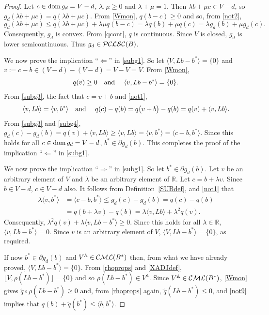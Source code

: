 \documentclass[letterpaper]{article}
\theoremstyle{plain}
\theoremstyle{definition}
\numberwithin{equation}{section}
\newcommand{\A}{{\mathbb A}}
\newcommand{\bra}[2]{\langle#1,#2\rangle}
\newcommand{\CML}{{\cal CML}}
\newcommand{\dom}{\hbox{\rm dom}}
\newcommand{\lr}{\Longrightarrow}
\newcommand{\PCLSC}{{\cal PCLSC}}
\newcommand{\qt}{\wt q}
\newcommand{\RR}{\mathbb R}
\newcommand{\rl}{\Longleftarrow}
\newcommand{\wt}{\widetilde}
\newcommand{\xbra}[2]{\lfloor#1,#2\rfloor}
\newcommand{\Def}{Definition~\ref}
\begin{document}
\begin{proof}
Let $c \in \dom\,g_d = V - d$, $\lambda, \mu \ge 0$ and $\lambda + \mu = 1$. Then $\lambda b + \mu c \in V - d$, so $g_d(\lambda b + \mu c) = q(\lambda b + \mu c)$.   From \eqref{Wmon}, $q(b - c) \ge 0$  and so, from \eqref{not2},
%
$$g_d(\lambda b + \mu c) \le q(\lambda b + \mu c) + \lambda\mu q(b - c) = \lambda q(b) + \mu q(c) = \lambda g_d(b) + \mu g_d(c).$$
%
Consequently, $g_d$ is convex.  From \eqref{qcont}, $q$ is continuous.   Since $V$ is closed, $g_d$ is lower semicontinuous.   Thus $g_d \in \PCLSC(B)$.
\par
We now prove the implication ``$\rl$'' in \eqref{subg1}.  So let $\bra{V}{Lb - b^*} = \{0\}$ and $v := c - b \in (V - d) - (V - d) = V - V = V$.  From \eqref{Wmon},
\begin{equation}\label{subg3}
q(v) \ge 0\hbox{\quad and \quad}\bra{v}{Lb - b^*} = \{0\}. 
\end{equation}
%
%
From \eqref{subg3}, the fact that $c = v + b$ and \eqref{not1},
\begin{equation}\label{subg4}
\bra{v}{Lb} = \bra{v}{b^*}\hbox{\quad and \quad}q(c) - q(b) = q\big(v + b\big) - q(b) = q(v) + \bra{v}{Lb}.
\end{equation}
%
From \eqref{subg3} and \eqref{subg4}, $g_d(c) - g_d(b) = q(v) + \bra{v}{Lb} \ge \bra{v}{Lb} = \bra{v}{b^*} =  \bra{c - b}{b^*}$.   Since this holds for all $c \in \dom\,g_d = V - d$, $b^* \in \partial g_d(b)$.   This completes the proof of the implication ``$\rl$'' in \eqref{subg1}.

We now prove the implication ``$\lr$'' in \eqref{subg1}.   So let $b^* \in \partial g_d(b)$.   Let $v$ be an arbitrary element of $V$ and $\lambda$ be an arbitrary element of $\RR$.   Let $c = b + \lambda v$.   Since $b \in V - d$, $c \in V - d$ also.  It follows from \Def{SUBdef}, and \eqref{not1} that   
%
\begin{align*}
\lambda\bra{v}{b^*} &= \bra{c - b}{b^*} \le g_d(c) - g_d(b) = q(c) - q(b)\\
&= q(b + \lambda v) - q(b) = \lambda\bra{v}{Lb} + \lambda^2q(v).
\end{align*}
%
Consequently, $\lambda^2q(v) + \lambda\bra{v}{Lb - b^*} \ge 0$.   Since this holds for all $\lambda \in \RR$, $\bra{v}{Lb - b^*} = 0$.   Since $v$ is an arbitrary element of $V$, $\bra{V}{Lb - b^*} = \{0\}$, as required.

If now $b^* \in \partial g_d(b)$  and  $V^\A \in \CML(B^*)$ then, from what we have already proved,      $\bra{V}{Lb - b^*} = \{0\}$.   From \eqref{rhoprops} and \eqref{XADJdef}, $\xbra{V}{\rho(Lb - b^*)} = \{0\}$ and so $\rho(Lb - b^*) \in V^\A$.   Since $V^\A \in \CML(B^*)$, \eqref{Wmon} gives $\qt\circ\rho(Lb - b^*) \ge 0$ and, from \eqref{rhoprops} again, $\qt(Lb - b^*) \le 0$, and \eqref{not9} implies that $q(b) + \qt(b^*) \le \bra{b}{b^*}$. 
\end{proof}
\end{document}
